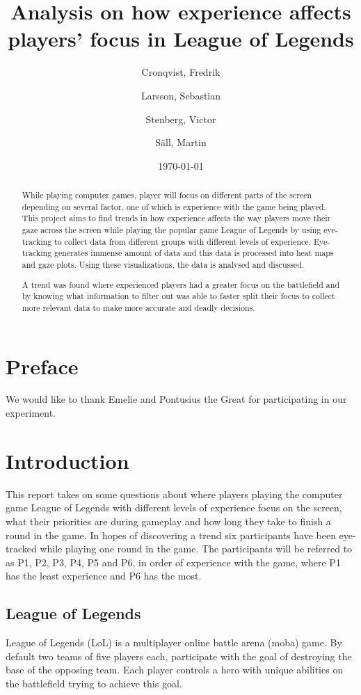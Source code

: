 \documentclass{report}
\author{Cronqvist, Fredrik \and Larsson, Sebastian \and Stenberg, Victor \and S\"{a}ll, Martin}
\date{\today}
\title{Analysis on how experience affects players' focus in League of Legends}
\begin{document}
\maketitle

\begin{abstract}
While playing computer games, player will focus on different parts of the screen depending on several factor, one of which is experience with the game being played. This project aims to find trends in how experience affects the way players move their gaze across the screen while playing the popular game League of Legends by using eye-tracking to collect data from different groups with different levels of experience. Eye-tracking generates immense amount of data and this data is processed into heat maps and gaze plots. Using these visualizations, the data is analysed and discussed.

A trend was found where experienced players had a greater focus on the battlefield and by knowing what information to filter out was able to faster split their focus to collect more relevant data to make more accurate and deadly decisions.
\end{abstract}

\begingroup
\chapter*{Preface}
We would like to thank Emelie and Pontusius the Great for participating in our experiment.

\let\clearpage\relax

\tableofcontents
\endgroup

\chapter{Introduction}
This report takes on some questions about where players playing the computer game League of Legends with different levels of experience focus on the screen, what their priorities are during gameplay and how long they take to finish a round in the game. In hopes of discovering a trend six participants have been eye-tracked while playing one round in the game. The participants will be referred to as P1, P2, P3, P4, P5 and P6, in order of experience with the game, where P1 has the least experience and P6 has the most.

\section{League of Legends}
League of Legends (LoL) is a multiplayer online battle arena (moba) game. By default two teams of five players each, participate with the goal of destroying the base of the opposing team. Each player controls a hero with unique abilities on the battlefield trying to achieve this goal.
\end{document}
